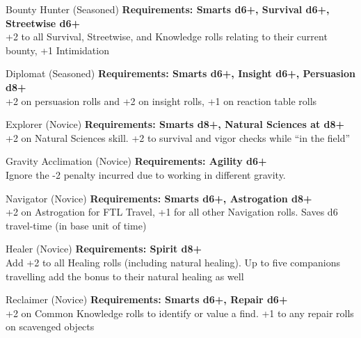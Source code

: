 \begin{multicols}{2}
\begin{genericsection}{Bounty Hunter (Seasoned)}
\textbf{Requirements: Smarts d6+, Survival d6+, Streetwise d6+}\\
+2 to all Survival, Streetwise, and Knowledge rolls relating to their current bounty, +1 Intimidation
\end{genericsection}

\begin{genericsection}{Diplomat (Seasoned)}
\textbf{Requirements: Smarts d6+, Insight d6+, Persuasion d8+}\\
+2 on persuasion rolls and +2 on insight rolls, +1 on reaction table rolls
\end{genericsection}

\begin{genericsection}{Explorer (Novice)}
\textbf{Requirements: Smarts d8+, Natural Sciences at d8+}\\
+2 on Natural Sciences skill. +2 to survival and vigor checks while “in the field”
\end{genericsection}

\begin{genericsection}{Gravity Acclimation (Novice)}
\textbf{Requirements: Agility d6+}\\
Ignore the -2 penalty incurred due to working in different gravity.
\end{genericsection}

\begin{genericsection}{Navigator (Novice)}
\textbf{Requirements: Smarts d6+, Astrogation d8+}\\
+2 on Astrogation for FTL Travel, +1 for all other Navigation rolls. Saves d6 travel-time (in base unit of time)
\end{genericsection}

\begin{genericsection}{Healer (Novice)}
\textbf{Requirements: Spirit d8+}\\
Add +2 to all Healing rolls (including natural healing). Up to five companions travelling add the bonus to their natural healing as well
\end{genericsection}

\begin{genericsection}{Reclaimer (Novice)}
\textbf{Requirements: Smarts d6+, Repair d6+}\\
+2 on Common Knowledge rolls to identify or value a find. +1 to any repair rolls on scavenged objects
\end{genericsection}


\end{multicols}
